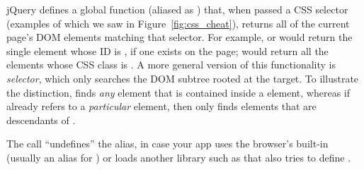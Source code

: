

jQuery defines a global function  (aliased as \C{\$()})
that, when passed a CSS selector (examples of which we saw in
Figure~\ref{fig:css_cheat}), returns all of the current page's DOM
elements matching that selector.  For example,
or  would return the single element whose ID is
, if one exists on the page;
 would return all the  elements whose CSS class
is .
A more general version of this functionality is
\emph{selector}\C{)},
which only searches the DOM subtree rooted at the target.  To illustrate
the distinction,  finds \emph{any}  element that
is contained inside a  element, whereas if  already refers
to a \emph{particular}  element, then  only
finds  elements that are descendants of .
\begin{sidebar}[-0.5in]{}%
    The call  ``undefines'' the \C{\$} alias,
    in case your app uses the browser's built-in \C{\$} (usually an alias
    for ) or loads another \js{} library such as
     that also tries to define
    \C{\$}.
\end{sidebar}
